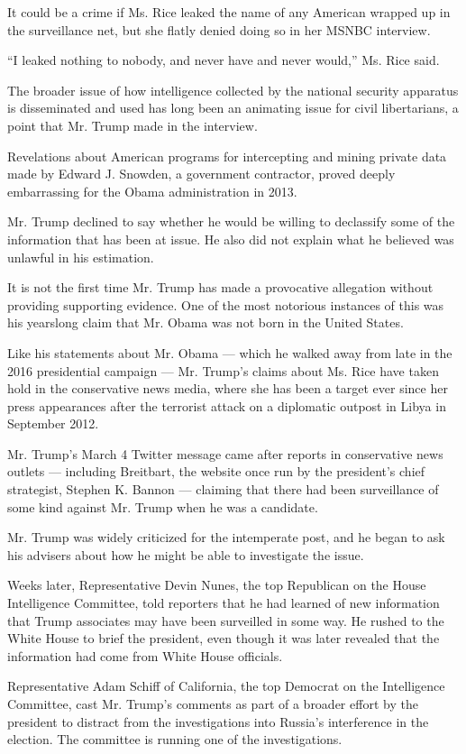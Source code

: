 It could be a crime if Ms. Rice leaked the name of any American wrapped
up in the surveillance net, but she flatly denied doing so in her MSNBC
interview.

``I leaked nothing to nobody, and never have and never would,'' Ms. Rice
said.

The broader issue of how intelligence collected by the national security
apparatus is disseminated and used has long been an animating issue for
civil libertarians, a point that Mr. Trump made in the interview.

Revelations about American programs for intercepting and mining private
data made by Edward J. Snowden, a government contractor, proved deeply
embarrassing for the Obama administration in 2013.

Mr. Trump declined to say whether he would be willing to declassify some
of the information that has been at issue. He also did not explain what
he believed was unlawful in his estimation.

It is not the first time Mr. Trump has made a provocative allegation
without providing supporting evidence. One of the most notorious
instances of this was his yearslong claim that Mr. Obama was not born in
the United States.

Like his statements about Mr. Obama --- which he walked away from late
in the 2016 presidential campaign --- Mr. Trump's claims about Ms. Rice
have taken hold in the conservative news media, where she has been a
target ever since her press appearances after the terrorist attack on a
diplomatic outpost in Libya in September 2012.

Mr. Trump's March 4 Twitter message came after reports in conservative
news outlets --- including Breitbart, the website once run by the
president's chief strategist, Stephen K. Bannon --- claiming that there
had been surveillance of some kind against Mr. Trump when he was a
candidate.

Mr. Trump was widely criticized for the intemperate post, and he began
to ask his advisers about how he might be able to investigate the issue.

Weeks later, Representative Devin Nunes, the top Republican on the House
Intelligence Committee, told reporters that he had learned of new
information that Trump associates may have been surveilled in some way.
He rushed to the White House to brief the president, even though it was
later revealed that the information had come from White House officials.

Representative Adam Schiff of California, the top Democrat on the
Intelligence Committee, cast Mr. Trump's comments as part of a broader
effort by the president to distract from the investigations into
Russia's interference in the election. The committee is running one of
the investigations.

